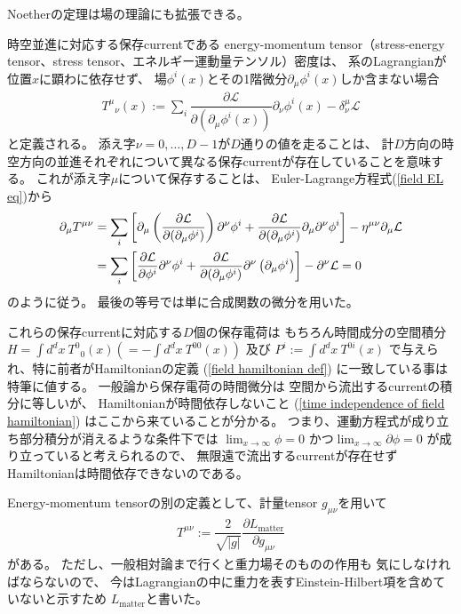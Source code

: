 Noetherの定理は場の理論にも拡張できる。

時空並進に対応する保存currentである
energy-momentum tensor（stress-energy tensor、stress tensor、エネルギー運動量テンソル）密度は、
系のLagrangianが位置$x$に顕わに依存せず、
場$\phi^i(x)$とその1階微分$\partial_\mu \phi^i(x)$しか含まない場合
\begin{align}
  T^{\mu}{}_{\nu} (x)
:= \sum_i
	\dfrac{\partial \mathcal{L}}{\partial (\partial_\mu \phi^i (x) )}
	\partial_\nu \phi^i(x)
- \delta^{\mu}_{\nu} \mathcal{L}
\label{energy-momentum on flat space}
\end{align}
と定義される。
添え字$\nu = 0,\dots, D-1$が$D$通りの値を走ることは、
計$D$方向の時空方向の並進それぞれについて異なる保存currentが存在していることを意味する。
これが添え字$\mu$について保存することは、
Euler-Lagrange方程式(\ref{field EL eq})から
\begin{align}
	\partial_\mu T^{\mu \nu}
&= \sum_i \left[
		\partial_\mu \left(
			\dfrac{\partial \mathcal{L}}{\partial (\partial_\mu \phi^i)}
		\right)
		\partial^\nu \phi^i
	+	\dfrac{\partial \mathcal{L}}{\partial (\partial_\mu \phi^i)}
		\partial_\mu \partial^\nu \phi^i
	\right]
	- \eta^{\mu \nu} \partial_\mu \mathcal{L}
\notag\\&
= \sum_i \left[
		\dfrac{\partial \mathcal{L}}{\partial \phi^i}
		\partial^\nu \phi^i
	+	\dfrac{\partial \mathcal{L}}{\partial (\partial_\mu \phi^i )}
		\partial^\nu \left(
			\partial_\mu \phi^i
		\right)
	\right]
	- \partial^\nu \mathcal{L} = 0
\end{align}
のように従う。
最後の等号では単に合成関数の微分を用いた。

これらの保存currentに対応する$D$個の保存電荷は
もちろん時間成分の空間積分
$H = \int d^dx\ T^{0}{}_0 (x)
(= - \int d^dx\ T^{00} (x))$
及び
$P^i := \int d^dx\ T^{0i} (x)$
で与えられ、特に前者がHamiltonianの定義
(\ref{field hamiltonian def})
に一致している事は特筆に値する。
一般論から保存電荷の時間微分は
空間から流出するcurrentの積分に等しいが、
Hamiltonianが時間依存しないこと
(\ref{time independence of field hamiltonian})
はここから来ていることが分かる。
つまり、運動方程式が成り立ち部分積分が消えるような条件下では
$\displaystyle
\lim_{x \to \infty} \phi = 0$
かつ$\displaystyle
\lim_{x \to \infty} \partial \phi = 0$
が成り立っていると考えられるので、
無限遠で流出するcurrentが存在せず
Hamiltonianは時間依存できないのである。


Energy-momentum tensorの別の定義として、計量tensor $g_{\mu\nu}$を用いて
\begin{align}
  T^{\mu\nu}
:= \dfrac{2}{\sqrt{|g|} }
    \dfrac{\partial L_{\mathrm{matter}}}{\partial g_{\mu\nu}}
\label{energy-momentum}
\end{align}
がある。
ただし、一般相対論まで行くと重力場そのものの作用も
気にしなければならないので、
今はLagrangianの中に重力を表すEinstein-Hilbert項を含めていないと示すため
$L_{\mathrm{matter}}$と書いた。

